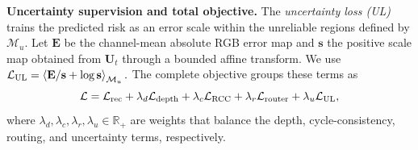 \documentclass[letterpaper,10pt,conference]{ieeeconf}
\newcommand{\R}{\mathbb{R}}
\newcommand{\I}{\mathbf{I}}
\newcommand{\D}{\mathbf{D}}
\newcommand{\M}{\mathcal{M}}
\newcommand{\U}{\mathbf{U}}
\begin{document}
\textbf{Uncertainty supervision and total objective.}
The \emph{uncertainty loss (UL)} trains the predicted risk as an error scale
within the unreliable regions defined by $\M_u$. Let
$\mathbf E$ be the channel-mean absolute RGB error map and $\mathbf s$ the
positive scale map obtained from $\U_t$ through a bounded affine transform. We use
\( \mathcal L_{\rm UL}
 =\left\langle \mathbf E/\mathbf s+\log \mathbf s\right\rangle_{\M_u}.\)
The complete objective groups these terms as
\begin{equation}
 \mathcal L=\mathcal L_{\rm rec}+\lambda_d\mathcal L_{\rm depth}
 +\lambda_c\mathcal L_{\rm RCC}+\lambda_r\mathcal L_{\rm router}
 +\lambda_u\mathcal L_{\rm UL},
\label{eq:total-loss}
\end{equation}
where $\lambda_d,\lambda_c,\lambda_r,\lambda_u\in\R_+$ are weights that
balance the depth, cycle-consistency, routing, and uncertainty terms,
respectively.


\end{document}
